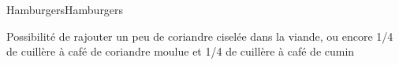 \begin{recette}{Hamburgers}{Hamburgers}
\begin{conseils}
Possibilité de rajouter un peu de coriandre ciselée dans la viande, ou encore 1/4 de cuillère à café de coriandre moulue et 1/4 de cuillère à café de cumin
\end{conseils}

\end{recette}